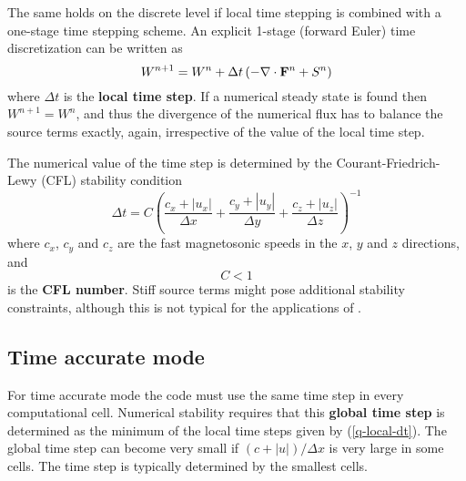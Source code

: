 The same holds on the discrete level if local time stepping is combined
with a one-stage time stepping scheme. An explicit 1-stage (forward Euler) 
time discretization can be written as
\begin{equation}
W^{n+1}=W^n + \Delta t\left(-\nabla\cdot\mathbf F^n + S^n\right) \label{q-one-stage}
\end{equation}
where $\Delta t$ is the {\bf local time step}. 
If a numerical steady state is found then $W^{n+1}=W^n$, and thus
the divergence of the numerical flux has to balance the source terms
exactly, again, irrespective of the value of the local time step.

The numerical value of the time step is determined by the 
Courant-Friedrich-Lewy (CFL) stability condition
\begin{equation}
\Delta t = C \left(\frac{c_x+|u_x|}{\Delta x}
                  +\frac{c_y+|u_y|}{\Delta y}
                  +\frac{c_z+|u_z|}{\Delta z}\right)^{-1} \label{q-local-dt}
\end{equation}
where $c_x$, $c_y$ and $c_z$ are the fast magnetosonic speeds in the
$x$, $y$ and $z$ directions, and 
\begin{equation}
   C<1
\label{eq:cfl_limit}
\end{equation}
is the {\bf CFL number}. 
Stiff source terms might pose additional stability constraints, 
although this is not typical for the applications of \BATSRUS.

\subsection{Time accurate mode \label{section:time_accurate}}

For time accurate mode the code must use the same time step in every
computational cell.
Numerical stability requires that this  {\bf global time step}
is determined as the minimum of the local time steps given by
(\ref{q-local-dt}). 
The global time step can become very small if $(c+|u|)/\Delta x$ is
very large in some cells. The time step is typically
determined by the smallest cells. 

